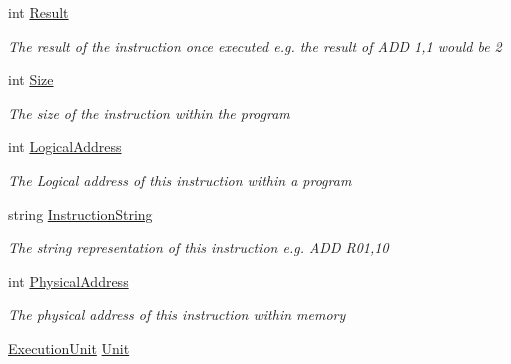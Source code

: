 \begin{DoxyCompactItemize}
int \hyperlink{class_c_p_u___o_s___simulator_1_1_c_p_u_1_1_instruction_a8e0f7c63850af7cfd8a41c066c01838e}{Result}
\begin{DoxyCompactList}\small\item\em The result of the instruction once executed e.\+g. the result of A\+D\+D 1,1 would be 2 \end{DoxyCompactList}\item 
int \hyperlink{class_c_p_u___o_s___simulator_1_1_c_p_u_1_1_instruction_a7c60418808e7bd6cb1964a227dcd9dac}{Size}
\begin{DoxyCompactList}\small\item\em The size of the instruction within the program \end{DoxyCompactList}\item 
int \hyperlink{class_c_p_u___o_s___simulator_1_1_c_p_u_1_1_instruction_abfc23dbc9a978d2a1468b819f87a7614}{Logical\+Address}
\begin{DoxyCompactList}\small\item\em The Logical address of this instruction within a program \end{DoxyCompactList}\item 
string \hyperlink{class_c_p_u___o_s___simulator_1_1_c_p_u_1_1_instruction_a2750b111d827f6e6a8fccd0e8520de89}{Instruction\+String}
\begin{DoxyCompactList}\small\item\em The string representation of this instruction e.\+g. A\+D\+D R01,10 \end{DoxyCompactList}\item 
int \hyperlink{class_c_p_u___o_s___simulator_1_1_c_p_u_1_1_instruction_a97b20c8a0a7536bdddd8e791605a8bac}{Physical\+Address}
\begin{DoxyCompactList}\small\item\em The physical address of this instruction within memory \end{DoxyCompactList}\item 
\hyperlink{class_c_p_u___o_s___simulator_1_1_c_p_u_1_1_execution_unit}{Execution\+Unit} \hyperlink{class_c_p_u___o_s___simulator_1_1_c_p_u_1_1_instruction_a75e93b5a62558ece7da698068625bd8f}{Unit}

\end{DoxyCompactItemize}

